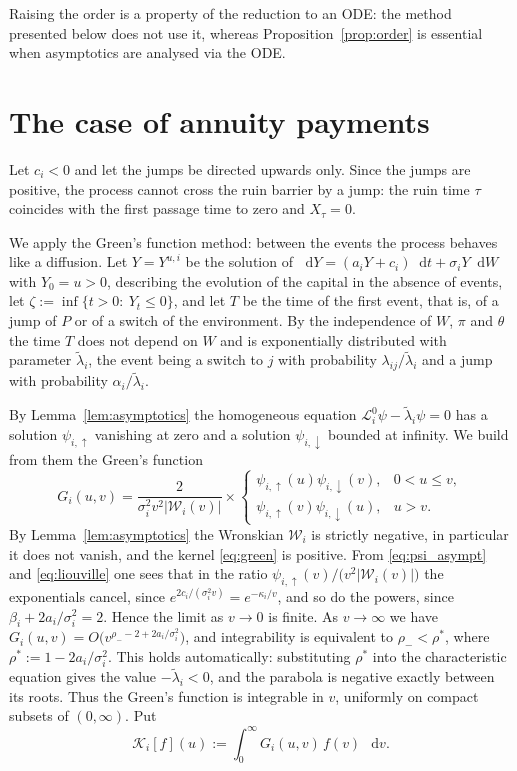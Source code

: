 \documentclass[smallextended]{svjour3}
\newcommand{\diff}{\mathop{}\!\mathrm{d}}
\begin{document}
Raising the order is a property of the reduction to an ODE: the method
presented below does not use it, whereas Proposition~\ref{prop:order} is
essential when asymptotics are analysed via the ODE.

\section{The case of annuity payments}
\label{s5}

Let $c_i<0$ and let the jumps be directed upwards only. Since the jumps are
positive, the process cannot cross the ruin barrier by a jump: the ruin time
$\tau$ coincides with the first passage time to zero and $X_\tau=0$.

We apply the Green's function method: between the events the process behaves
like a diffusion. Let $Y=Y^{u,i}$ be the solution of
$\diff Y=(a_iY+c_i)\diff t+\sigma_iY\diff W$ with $Y_0=u>0$, describing the
evolution of the capital in the absence of events, let
$\zeta:=\inf\{t>0:\ Y_t\le0\}$, and let $T$ be the time of the first event,
that is, of a jump of $P$ or of a switch of the environment. By the
independence of $W$, $\pi$ and $\theta$ the time $T$ does not depend on $W$ and
is exponentially distributed with parameter $\tilde\lambda_i$, the event being a
switch to $j$ with probability $\lambda_{ij}/\tilde\lambda_i$ and a jump with
probability $\alpha_i/\tilde\lambda_i$.

By Lemma~\ref{lem:asymptotics} the homogeneous equation
$\mathcal L^0_i\psi-\tilde\lambda_i\psi=0$ has a solution $\psi_{i,\uparrow}$
vanishing at zero and a solution $\psi_{i,\downarrow}$ bounded at infinity. We
build from them the Green's function
\begin{equation}
    \label{eq:green}
    G_i(u,v)=\frac{2}{\sigma_i^2v^2|\mathcal W_i(v)|}\times
    \begin{cases}
    \psi_{i,\uparrow}(u)\psi_{i,\downarrow}(v), & 0<u\le v, \\
    \psi_{i,\uparrow}(v)\psi_{i,\downarrow}(u), & u>v.
    \end{cases}
\end{equation}
By Lemma~\ref{lem:asymptotics} the Wronskian $\mathcal W_i$ is strictly
negative, in particular it does not vanish, and the kernel \eqref{eq:green} is
positive. From \eqref{eq:psi_asympt} and \eqref{eq:liouville} one sees that in
the ratio $\psi_{i,\uparrow}(v)/\bigl(v^2|\mathcal W_i(v)|\bigr)$ the
exponentials cancel, since $e^{2c_i/(\sigma_i^2v)}=e^{-\kappa_i/v}$, and so do
the powers, since $\beta_i+2a_i/\sigma_i^2=2$. Hence the limit as $v\to0$ is
finite. As $v\to\infty$ we have
$G_i(u,v)=O\bigl(v^{\rho_--2+2a_i/\sigma_i^2}\bigr)$, and integrability is
equivalent to $\rho_-<\rho^*$, where $\rho^*:=1-2a_i/\sigma_i^2$. This holds
automatically: substituting $\rho^*$ into the characteristic equation gives the
value $-\tilde\lambda_i<0$, and the parabola is negative exactly between its
roots. Thus the Green's function is integrable in $v$, uniformly on compact
subsets of $(0,\infty)$. Put
$$
    \mathcal K_i[f](u):=\int_0^\infty G_i(u,v)\,f(v)\,\diff v .
$$
\end{document}
